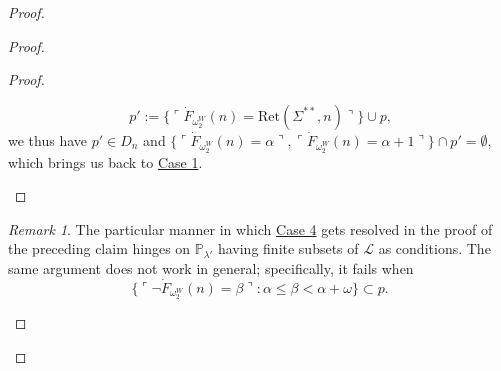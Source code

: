 \documentclass[12pt, twoside]{memoir}
\numberwithin{equation}{section}
\theoremstyle{definition}
\theoremstyle{remark}
\newtheorem{rem}[thm]{Remark}
\theoremstyle{definition}
\theoremstyle{definition}
\theoremstyle{definition}
\theoremstyle{remark}
\begin{document}
\begin{proof}
\begin{proof}
\begin{proof}
\begin{enumerate}[label=Case \arabic*:, leftmargin=50pt]
    \begin{equation*}
        p' := \{\ulcorner \dot{F}_{\omega_2^W}(n) = \mathrm{Ret}(\Sigma^{**}, n) \urcorner\} \cup p \text{,}
    \end{equation*}
    we thus have $p' \in D_n$ and $\{\ulcorner \dot{F}_{\omega_2^W}(n) = \alpha \urcorner, \ulcorner \dot{F}_{\omega_2^W}(n) = \alpha + 1\urcorner\} \cap p' = \emptyset$, which brings us back to \hyperref[7411c1]{Case 1}. \qedhere
\end{enumerate}
\end{proof}

\begin{rem}\label{rem7412}
The particular manner in which \hyperref[7411c4]{Case 4} gets resolved in the proof of the preceding claim hinges on $\mathbb{P}_{\lambda'}$ having finite subsets of $\mathcal{L}$ as conditions. The same argument does not work in general; specifically, it fails when 
\begin{equation*}
    \{\ulcorner \neg \dot{F}_{\omega_2^W}(n) = \beta \urcorner : \alpha \leq \beta < \alpha + \omega\} \subset p \text{.}
\end{equation*}
\end{rem}


\end{proof}
\end{proof}
\end{document}
